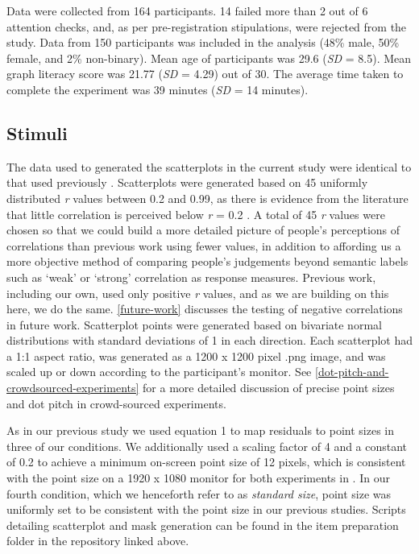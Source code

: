 \documentclass{vgtc}                          %
\begin{document}
Data were collected from 164 participants. 14 failed more than 2 out of 6 attention
checks, and, as per pre-registration stipulations, were rejected from the study. Data
from 150 participants was included in the analysis (48\% male, 50\% female, and 2\% non-binary). Mean age of participants was 29.6 (\emph{SD} = 8.5). Mean graph literacy score was 21.77
(\emph{SD} = 4.29) out of 30. The average time taken to complete
the experiment was 39 minutes (\emph{SD} = 14 minutes).

\hypertarget{stimuli}{%
\subsection{Stimuli}\label{stimuli}}

The data used to generated the scatterplots in the current study were identical to that
used previously \cite{strain_2023}. Scatterplots were generated based on 45 uniformly
distributed \emph{r} values between 0.2 and 0.99, as there is evidence from the literature
that little correlation is perceived below \emph{r} = 0.2 \cite{strahan_1978, bobko_1979, cleveland_1982}.
A total of 45 \emph{r} values were chosen so that we could build a more detailed picture
of people's perceptions of correlations than previous work using fewer values,
in addition to affording us a more objective method of comparing people's judgements
beyond semantic labels such as `weak' or `strong' correlation as response measures.
Previous work, including our own, used only positive \emph{r} values, and as we are building on this
here, we do the same. \autoref{future-work} discusses the testing of negative
correlations in future work. Scatterplot points were generated based on bivariate normal distributions with
standard deviations of 1 in each direction. Each scatterplot had a 1:1 aspect ratio,
was generated as a 1200 x 1200 pixel .png image, and was
scaled up or down according to the participant's monitor. See
\autoref{dot-pitch-and-crowdsourced-experiments} for a more detailed discussion of
precise point sizes and dot pitch in crowd-sourced experiments.

As in our previous study \cite{strain_2023} we used equation 1 to map residuals
to point sizes in three of our conditions. We additionally used a scaling factor
of 4 and a constant of 0.2 to achieve a minimum on-screen point size of 12 pixels,
which is consistent with the point size on a 1920 x 1080 monitor for both experiments
in \cite{strain_2023}. In our fourth condition, which we henceforth refer to as \emph{standard size},
point size was uniformly set to be consistent with the point size in our previous
studies. Scripts detailing scatterplot and mask generation can be found in the item
preparation folder in the repository linked above.
\end{document}
